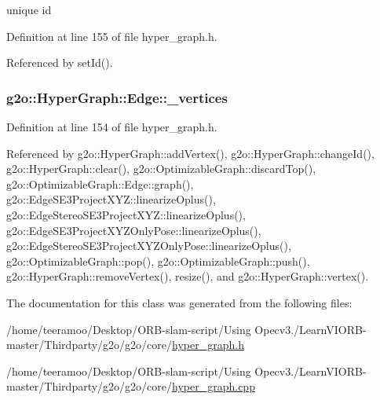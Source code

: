 unique id 



Definition at line 155 of file hyper\+\_\+graph.\+h.



Referenced by set\+Id().

\subsubsection[{\texorpdfstring{\+\_\+vertices}{_vertices}}]{ g2o\+::\+Hyper\+Graph\+::\+Edge\+::\+\_\+vertices\hspace{0.3cm}{\ttfamily [protected]}}\hypertarget{classg2o_1_1HyperGraph_1_1Edge_aabb036d331fc7f2524ec8611b638de92}{}\label{classg2o_1_1HyperGraph_1_1Edge_aabb036d331fc7f2524ec8611b638de92}


Definition at line 154 of file hyper\+\_\+graph.\+h.



Referenced by g2o\+::\+Hyper\+Graph\+::add\+Vertex(), g2o\+::\+Hyper\+Graph\+::change\+Id(), g2o\+::\+Hyper\+Graph\+::clear(), g2o\+::\+Optimizable\+Graph\+::discard\+Top(), g2o\+::\+Optimizable\+Graph\+::\+Edge\+::graph(), g2o\+::\+Edge\+S\+E3\+Project\+X\+Y\+Z\+::linearize\+Oplus(), g2o\+::\+Edge\+Stereo\+S\+E3\+Project\+X\+Y\+Z\+::linearize\+Oplus(), g2o\+::\+Edge\+S\+E3\+Project\+X\+Y\+Z\+Only\+Pose\+::linearize\+Oplus(), g2o\+::\+Edge\+Stereo\+S\+E3\+Project\+X\+Y\+Z\+Only\+Pose\+::linearize\+Oplus(), g2o\+::\+Optimizable\+Graph\+::pop(), g2o\+::\+Optimizable\+Graph\+::push(), g2o\+::\+Hyper\+Graph\+::remove\+Vertex(), resize(), and g2o\+::\+Hyper\+Graph\+::vertex().



The documentation for this class was generated from the following files\+:\begin{DoxyCompactItemize}
\item 
/home/teeramoo/\+Desktop/\+O\+R\+B-\/slam-\/script/\+Using Opecv3./\+Learn\+V\+I\+O\+R\+B-\/master/\+Thirdparty/g2o/g2o/core/\hyperlink{hyper__graph_8h}{hyper\+\_\+graph.\+h}\item 
/home/teeramoo/\+Desktop/\+O\+R\+B-\/slam-\/script/\+Using Opecv3./\+Learn\+V\+I\+O\+R\+B-\/master/\+Thirdparty/g2o/g2o/core/\hyperlink{hyper__graph_8cpp}{hyper\+\_\+graph.\+cpp}\end{DoxyCompactItemize}
